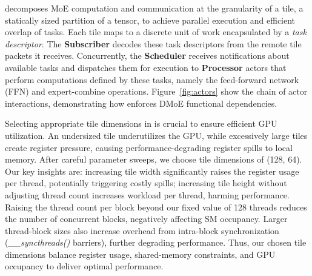 
\sysname decomposes MoE computation and communication at the granularity of a tile, a statically sized partition of a tensor,
to achieve parallel execution and efficient overlap of tasks.
Each tile maps to a discrete unit of work encapsulated by a \emph{task descriptor}.
The \textbf{Subscriber} decodes these task descriptors from the remote tile packets it receives.
Concurrently, the \textbf{Scheduler} receives notifications about available tasks and dispatches them for execution
to \textbf{Processor} actors that perform computations defined by these tasks,
namely the feed-forward network (FFN) and expert-combine operations.
Figure~\ref{fig:actors} show the chain of actor interactions, demonstrating how \sysname
enforces DMoE functional dependencies.

Selecting appropriate tile dimensions in \sysname is crucial to ensure efficient GPU utilization.
An undersized tile underutilizes the GPU,
while excessively large tiles create register pressure,
causing performance-degrading register spills to local memory.
After careful parameter sweeps,
we choose tile dimensions of (128, 64).
Our key insights are: increasing tile width significantly raises the register usage per thread,
potentially triggering costly spills;
increasing tile height without adjusting thread count increases workload per thread, harming performance.
Raising the thread count per block beyond our fixed value of 128 threads reduces the number of concurrent blocks,
negatively affecting SM occupancy.
Larger thread-block sizes also increase overhead from intra-block synchronization (\emph{\_\_syncthreads()} barriers),
further degrading performance.
Thus, our chosen tile dimensions balance register usage, shared-memory constraints,
and GPU occupancy to deliver optimal performance.

